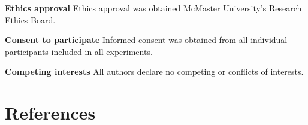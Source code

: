 \documentclass[
  11pt,
  letterpaper,
]{article}
\begin{document}
\noindent \textbf{Ethics approval} \hspace{0.5em} Ethics approval was
obtained McMaster University's Research Ethics Board.

\vspace{5pt}

\noindent \textbf{Consent to participate} \hspace{0.5em} Informed
consent was obtained from all individual participants included in all
experiments.

\vspace{5pt}

\noindent \textbf{Competing interests} \hspace{0.5em} All authors
declare no competing or conflicts of interests.

\clearpage

\section{References}\label{references}
\end{document}
